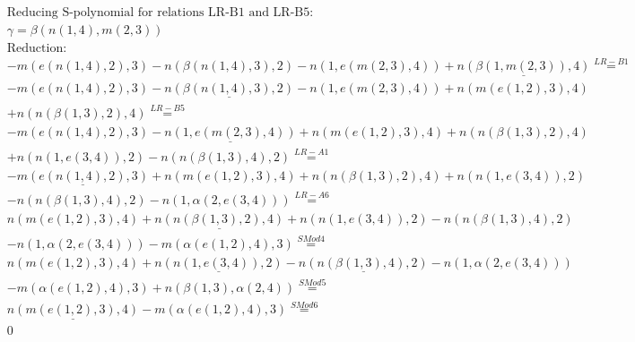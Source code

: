 \documentclass[11pt]{amsart}
\begin{document}
\begin{align*} 
& \text{Reducing S-polynomial for relations LR-B1 and LR-B5:} \\ 
& \gamma = \beta(n(1,4),m(2,3)) \\ 
& \text{Reduction}: \\& - m(e(n(1,4),2),3) - n(\beta(n(1,4),3),2) - n(1,e(m(2,3),4)) + \underline{n(\beta(1,m(2,3)),4)} \stackrel{ LR-B1 }{=}  \\ 
& - m(e(n(1,4),2),3) - \underline{n(\beta(n(1,4),3),2)} - n(1,e(m(2,3),4)) + n(m(e(1,2),3),4)\\ 
 &  + n(n(\beta(1,3),2),4) \stackrel{ LR-B5 }{=}  \\ 
& - m(e(n(1,4),2),3) - \underline{n(1,e(m(2,3),4))} + n(m(e(1,2),3),4) + n(n(\beta(1,3),2),4)\\ 
 &  + n(n(1,e(3,4)),2) - n(n(\beta(1,3),4),2) \stackrel{ LR-A1 }{=}  \\ 
& - \underline{m(e(n(1,4),2),3)} + n(m(e(1,2),3),4) + n(n(\beta(1,3),2),4) + n(n(1,e(3,4)),2)\\ 
 &  - n(n(\beta(1,3),4),2) - n(1,\alpha(2,e(3,4))) \stackrel{ LR-A6 }{=}  \\ 
&n(m(e(1,2),3),4) + \underline{n(n(\beta(1,3),2),4)} + n(n(1,e(3,4)),2) - n(n(\beta(1,3),4),2)\\ 
 &  - n(1,\alpha(2,e(3,4))) - m(\alpha(e(1,2),4),3) \stackrel{ SMod4 }{=}  \\ 
&n(m(e(1,2),3),4) + \underline{n(n(1,e(3,4)),2)} - \underline{n(n(\beta(1,3),4),2)} - n(1,\alpha(2,e(3,4)))\\ 
 &  - m(\alpha(e(1,2),4),3) + n(\beta(1,3),\alpha(2,4)) \stackrel{ SMod5 }{=}  \\ 
&\underline{n(m(e(1,2),3),4)} - m(\alpha(e(1,2),4),3) \stackrel{ SMod6 }{=}  \\ 
&0\\ 
\end{align*} 
 
\end{document}
